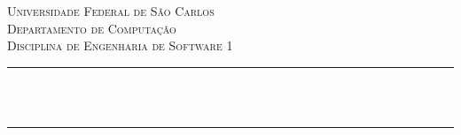 \begin{titlepage}
    \newcommand{\HRule}{\rule{\linewidth}{0.5mm}}
    \center
    
    \textsc{\LARGE Universidade Federal de São Carlos}\\[0.5cm]
    \textsc{\Large Departamento de Computação}\\[2cm]
    \textsc{\Large Disciplina de Engenharia de Software 1}\\[5cm]
    
    \makeatletter
    \HRule \\[0.4cm]
    { \huge \textbf \@title}\\[0.4cm]
    \HRule \\[3cm]
    

    {\Large \@author}\\[5cm]
    {\Large \@date}\\[2cm]
    \vfill
\end{titlepage}
